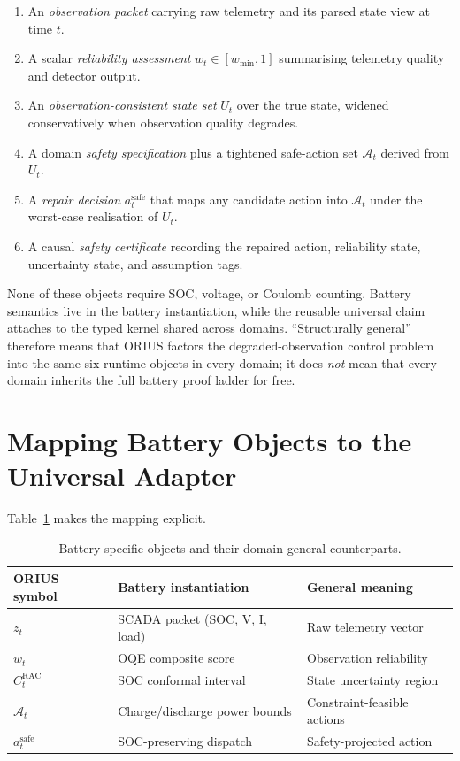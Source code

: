 \begin{enumerate}
  \item An \emph{observation packet} carrying raw telemetry and its parsed
    state view at time $t$.
  \item A scalar \emph{reliability assessment} $w_t \in [w_{\min}, 1]$
    summarising telemetry quality and detector output.
  \item An \emph{observation-consistent state set} $U_t$ over the true state,
    widened conservatively when observation quality degrades.
  \item A domain \emph{safety specification} plus a tightened safe-action set
    $\mathcal{A}_t$ derived from $U_t$.
  \item A \emph{repair decision} $a_t^{\text{safe}}$ that maps any candidate
    action into $\mathcal{A}_t$ under the worst-case realisation of $U_t$.
  \item A causal \emph{safety certificate} recording the repaired action,
    reliability state, uncertainty state, and assumption tags.
\end{enumerate}

None of these objects require SOC, voltage, or Coulomb counting.  Battery
semantics live in the battery instantiation, while the reusable universal
claim attaches to the typed kernel shared across domains.  ``Structurally
general'' therefore means that ORIUS factors the degraded-observation control
problem into the same six runtime objects in every domain; it does
\emph{not} mean that every domain inherits the full battery proof ladder for
free.

\section{Mapping Battery Objects to the Universal Adapter}

Table~\ref{tab:domain-mapping} makes the mapping explicit.

\begin{table}[ht]
\centering
\caption{Battery-specific objects and their domain-general counterparts.}
\label{tab:domain-mapping}
\begin{tabular}{lll}
\toprule
\textbf{ORIUS symbol} & \textbf{Battery instantiation} & \textbf{General meaning} \\
\midrule
$z_t$                  & SCADA packet (SOC, V, I, load) & Raw telemetry vector \\
$w_t$                  & OQE composite score            & Observation reliability \\
$C_t^{\text{RAC}}$     & SOC conformal interval          & State uncertainty region \\
$\mathcal{A}_t$        & Charge/discharge power bounds   & Constraint-feasible actions \\
$a_t^{\text{safe}}$    & SOC-preserving dispatch          & Safety-projected action \\
\bottomrule
\end{tabular}
\end{table}


